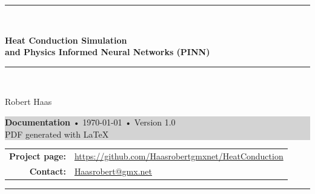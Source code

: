 \documentclass[a4paper,11pt]{article}
\theoremstyle{plain} %
\theoremstyle{definition} %
\theoremstyle{remark} %
\begin{document}
\begin{titlepage}
    \centering

    \vspace*{1cm}
    {\color{mainblue} \rule{1.0\textwidth}{2pt}}\\[0.5cm]

    {\Huge\bfseries Heat Conduction Simulation\\[0.3em]
    and Physics Informed Neural Networks (PINN)\par}
    
    \vspace*{0.5cm}
    {\color{mainblue} \rule{1.0\textwidth}{2pt}}\\[1.5cm]
    
    \vspace{1cm}

    {\Large Robert Haas}\\[0.3em]

    \vspace{4cm}
    \colorbox{lightgray}{
        \parbox{0.8\textwidth}{
            \vspace{1em}
            \centering
            {\normalsize\textbf{Documentation} • \today{ }• Version 1.0}\\[0.5em]
            {\small PDF generated with \LaTeX}
            \vspace{1em}
        }
    }

    \vfill

    {\footnotesize
    \begin{tabular}{rl}
    \textbf{Project page:} & \href{https://github.com/Haasrobertgmxnet/HeatConduction}{https://github.com/Haasrobertgmxnet/HeatConduction}\\
    \textbf{Contact:} & \href{mailto:Haasrobert@gmx.net}{Haasrobert@gmx.net} \\
    \end{tabular}
    }

    \vspace{2cm}
    {\color{mainblue} \rule{1.0\textwidth}{2pt}}  %
\end{titlepage}

\pagestyle{main}

\begin{abstract}
This documentation presents numerical studies for the 2D heat conduction equation. The heat equation is solved using classical numerical methods, such as explicit Euler and implicit Crank-Nicolson, as well as Physics Informed Neural Networks (PINNs). Comparisons between these methods are provided, highlighting stability, accuracy, and computational efficiency.
\end{abstract}
\end{document}
